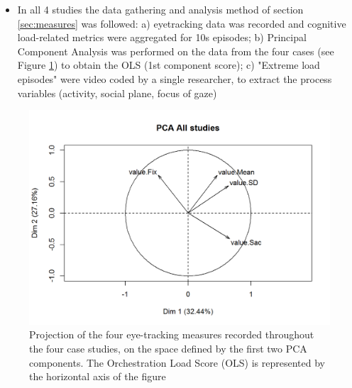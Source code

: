 \documentclass[10pt,journal,compsoc]{IEEEtran}
\begin{document}
\begin{itemize}
\item In all 4 studies the data gathering and analysis method of section \ref{sec:measures} was followed: a) eyetracking data was recorded and cognitive load-related metrics were aggregated for 10s episodes; b) Principal Component Analysis was performed on the data from the four cases (see Figure \ref{fig:pca}) to obtain the OLS (1st component score); c) "Extreme load episodes" were video coded by a single researcher, to extract the process variables (activity, social plane, focus of gaze) 
\end{itemize}

\begin{figure}[!t]
\centering
\includegraphics[width=\linewidth]{img/PCA.png}
\caption{Projection of the four eye-tracking measures recorded throughout the four case studies, on the space defined by the first two PCA components. The Orchestration Load Score (OLS) is represented by the horizontal axis of the figure}
\label{fig:pca}
\end{figure}
\end{document}
